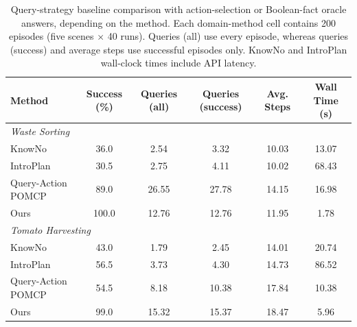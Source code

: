 \begin{table}[t]
\centering
\caption{Query-strategy baseline comparison with action-selection or Boolean-fact oracle answers, depending on the method. Each domain-method cell contains 200 episodes (five scenes $\times$ 40 runs). Queries (all) use every episode, whereas queries (success) and average steps use successful episodes only. KnowNo and IntroPlan wall-clock times include API latency.}
\label{tab:query_baselines}
\footnotesize
\begin{tabular}{lccccc}
\toprule
\textbf{Method} & \textbf{Success (\%)} & \textbf{Queries (all)} & \textbf{Queries (success)} & \textbf{Avg. Steps} & \textbf{Wall Time (s)} \\
\midrule
\multicolumn{5}{l}{\textit{Waste Sorting}} \\
KnowNo & 36.0 & 2.54 & 3.32 & 10.03 & 13.07 \\
IntroPlan & 30.5 & 2.75 & 4.11 & 10.02 & 68.43 \\
Query-Action POMCP & 89.0 & 26.55 & 27.78 & 14.15 & 16.98 \\
Ours & 100.0 & 12.76 & 12.76 & 11.95 & 1.78 \\
\midrule
\multicolumn{5}{l}{\textit{Tomato Harvesting}} \\
KnowNo & 43.0 & 1.79 & 2.45 & 14.01 & 20.74 \\
IntroPlan & 56.5 & 3.73 & 4.30 & 14.73 & 86.52 \\
Query-Action POMCP & 54.5 & 8.18 & 10.38 & 17.84 & 10.38 \\
Ours & 99.0 & 15.32 & 15.37 & 18.47 & 5.96 \\
\bottomrule
\end{tabular}
\end{table}
